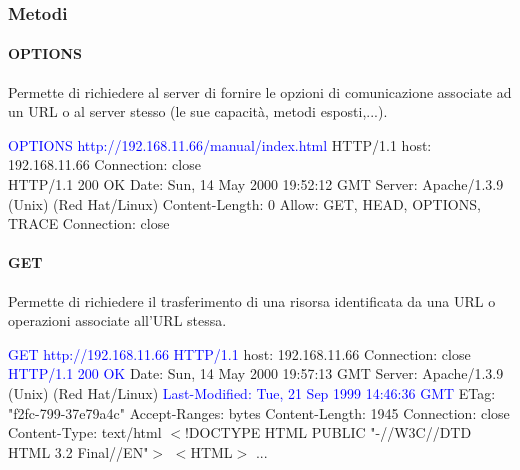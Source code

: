 \newpage

\subsubsection{Metodi}
\paragraph{OPTIONS} Permette di richiedere al server di fornire le opzioni di comunicazione associate ad un URL o al server stesso (le sue capacità, metodi esposti,...).
\begin{mdframed}
    \textcolor{blue}{OPTIONS http://192.168.11.66/manual/index.html}\newline
    HTTP/1.1\newline
    host: 192.168.11.66\newline
    Connection: close\newline
    \\
    HTTP/1.1 200 OK\newline
    Date: Sun, 14 May 2000 19:52:12 GMT\newline
    Server: Apache/1.3.9 (Unix) (Red Hat/Linux)\newline
    Content-Length: 0\newline
    Allow: GET, HEAD, OPTIONS, TRACE\newline
    Connection: close
\end{mdframed}

\paragraph{GET} Permette di richiedere il trasferimento di una risorsa identificata da una URL o operazioni associate all’URL stessa.
\begin{mdframed}
    \textcolor{blue}{GET http://192.168.11.66 HTTP/1.1}\newline
    host: 192.168.11.66\newline
    Connection: close\newline
    \\
    \textcolor{blue}{HTTP/1.1 200 OK}\newline
    Date: Sun, 14 May 2000 19:57:13 GMT\newline
    Server: Apache/1.3.9 (Unix) (Red Hat/Linux)\newline
    \textcolor{blue}{Last-Modified: Tue, 21 Sep 1999 14:46:36 GMT}\newline
    ETag: "f2fc-799-37e79a4c"\newline
    Accept-Ranges: bytes\newline
    Content-Length: 1945\newline
    Connection: close\newline
    Content-Type: text/html\newline
    $<$!DOCTYPE HTML PUBLIC "-//W3C//DTD HTML 3.2 Final//EN"$>$\newline
    $<$HTML$>$ ...
\end{mdframed}

